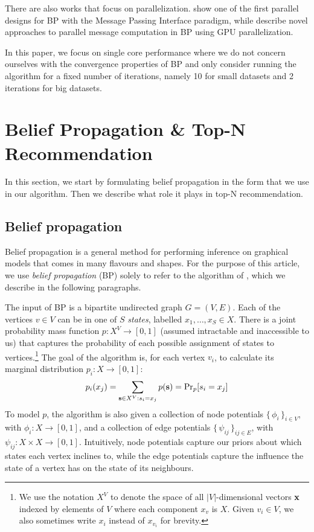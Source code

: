 \documentclass[letterpaper]{article}
\begin{document}
There are also works that focus on parallelization. \citet{related2} show one of the first parallel designs for BP with the Message Passing Interface paradigm, while \citet{related3} describe novel approaches to parallel message computation in BP using GPU parallelization.

In this paper, we focus on single core performance where we do not concern ourselves with the convergence properties of BP and only consider running the algorithm for a fixed number of iterations, namely 10 for small datasets and 2 iterations for big datasets. 

\section{Belief Propagation \& Top-N Recommendation}\label{sec:background}

In this section, we start by formulating belief propagation in the form that we
use in our algorithm. Then we describe what role it plays in top-N
recommendation.


\subsection{Belief propagation} \label{subsec:bp}

Belief propagation is a general method for performing inference on
graphical models that comes in many flavours and shapes. For the purpose of
this article, we use \emph{belief propagation} (BP) solely to refer to the algorithm
of \citet[Section 2.1]{top-n-recommendation}, which we describe in the
following paragraphs.

The input of BP is a bipartite undirected graph $G = (V, E)$. Each of the
vertices $v\in V$ can be in one of $S$ \emph{states}, labelled $x_1, \ldots,
x_S \in X$. There is a joint probability mass function $p: X^V \to [0, 1]$
(assumed intractable and inaccessible to us) that captures the probability of
each possible assignment of states to vertices.\footnote{We use the notation
$X^V$ to denote the space of all $|V|$-dimensional vectors $\vex$ indexed by
elements of $V$ where each component $x_v$ is $ X$. Given $v_i \in V$, we
also sometimes write $x_i$ instead of $x_{v_i}$ for brevity.} The goal of the
algorithm is, for each vertex $v_i$, to calculate its marginal distribution
$p_i: X \to [0, 1]$:
%
$$p_i(x_j) = \sum_{\ves \in X^V: s_i = x_j} p(\ves) = \Pr_p[s_i = x_j]$$
%
To model $p$, the algorithm is also given a collection of node potentials
$\{\,\phi_i\,\}_{i \in V}$, with $\phi_i: X \to [0, 1]$, and a collection of edge
potentials $\{\,\psi_{ij}\,\}_{ij \in E}$, with $\psi_{ij}: X\times X \to [0, 1]$.
Intuitively, node potentials capture our priors about which states each vertex
inclines to, while the edge potentials capture the influence the state of a
vertex has on the state of its neighbours.
\end{document}
